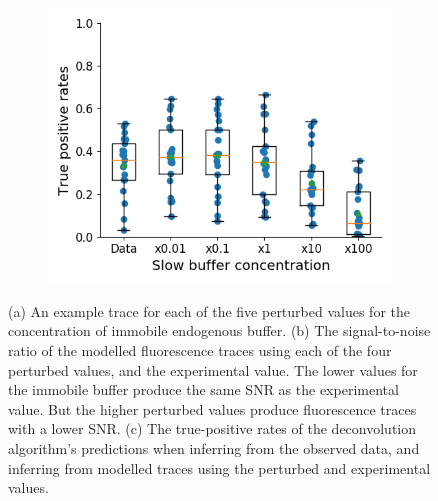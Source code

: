 \begin{figure}[p]
\begin{subfigure}{0.45\textwidth}
        \includegraphics[width=\linewidth]{figures/calcium_chapter/immobile_perturbed_oasis_first_paper.png}
        \caption{}
    \end{subfigure}
    \caption{(a) An example trace for each of the five perturbed values for the concentration of immobile endogenous buffer.	(b) The signal-to-noise ratio of the modelled fluorescence traces using each of the four perturbed values, and the experimental value. The lower values for the immobile buffer produce the same SNR as the experimental value. But the higher perturbed values produce fluorescence traces with a lower SNR.	(c) The true-positive rates of the deconvolution algorithm's predictions when inferring from the observed data, and inferring from modelled traces using the perturbed and experimental values.}
    \label{fig:endogenous_perturbed}
\end{figure}


